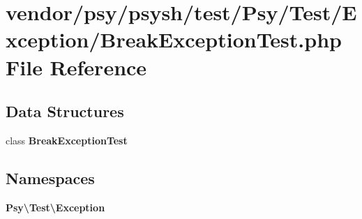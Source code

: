 \section{vendor/psy/psysh/test/\+Psy/\+Test/\+Exception/\+Break\+Exception\+Test.php File Reference}
\label{_break_exception_test_8php}
\subsection*{Data Structures}
\begin{DoxyCompactItemize}
\item 
class {\bf Break\+Exception\+Test}
\end{DoxyCompactItemize}
\subsection*{Namespaces}
\begin{DoxyCompactItemize}
\item 
 {\bf Psy\textbackslash{}\+Test\textbackslash{}\+Exception}
\end{DoxyCompactItemize}
